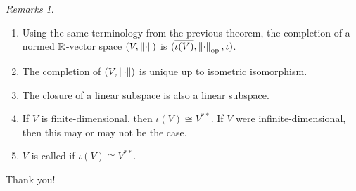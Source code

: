 \documentclass[10pt]{beamer}
\theoremstyle{plain} %
\theoremstyle{remark} %
\newtheorem*{remarks}{Remarks}
\begin{document}
\begin{frame}
    \begin{remarks}
        \begin{enumerate}[label = (\arabic*),itemsep=10pt,topsep=3pt]
            \item Using the same terminology from the previous theorem, the completion of a normed $\mathbb{R}$-vector space $(V,\left\lVert \cdot \right\rVert)$ is $(\overline{\iota(V)},\left\lVert \cdot \right\rVert_{\operatorname{op}},\iota)$.
            \item The completion of $(V,\left\lVert \cdot \right\rVert)$ is unique up to isometric isomorphism.
            \item The closure of a linear subspace is also a linear subspace.
            \item If $V$ is finite-dimensional, then $\iota(V) \cong V^{\ast\ast}$. If $V$ were infinite-dimensional, then this may or may not be the case.
            \item $V$ is called  if $\iota(V) \cong V^{\ast\ast}$.
        \end{enumerate}
    \end{remarks}
\end{frame}

\begin{frame}
    \center Thank you!
\end{frame}
\end{document}

